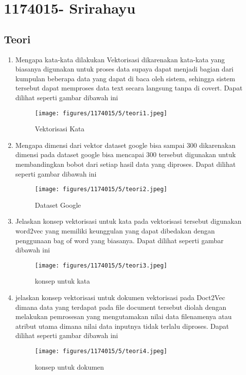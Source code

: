 \section{1174015-  Srirahayu}
    \subsection{Teori}
    \begin{enumerate}
        \item Mengapa kata-kata dilakukan Vektorisasi
        \subitem dikarenakan kata-kata yang biasanya digunakan untuk proses data supaya dapat menjadi bagian dari kumpulan beberapa data yang dapat di baca oleh sistem, sehingga sistem tersebut dapat memproses data text secara langsung tanpa di covert. Dapat dilihat seperti gambar dibawah ini
        \begin{figure}[H]
            \texttt{[image: figures/1174015/5/teori1.jpeg]}
            \centering
            \caption{Vektorisasi Kata}
        \end{figure}
        
        \item Mengapa dimensi dari vektor dataset google bisa sampai 300
        \subitem dikarenakan dimensi pada dataset google bisa mencapai 300 tersebut digunakan untuk membandingkan bobot dari setiap hasil data yang diproses. Dapat dilihat seperti gambar dibawah ini
        \begin{figure}[H]
            \texttt{[image: figures/1174015/5/teori2.jpeg]}
            \centering
            \caption{Dataset Google}
        \end{figure}
        
        \item Jelaskan konsep vektorisasi untuk kata
        \subitem pada vektorisasi tersebut digunakan word2vec yang memiliki keunggulan yang dapat dibedakan dengan penggunaan bag of word yang biasanya. Dapat dilihat seperti gambar dibawah ini
        \begin{figure}[H]
            \texttt{[image: figures/1174015/5/teori3.jpeg]}
            \centering
            \caption{konsep untuk kata}
        \end{figure}
        
        \item jelaskan konsep vektorisasi untuk dokumen
        \subitem vektorisasi pada Doct2Vec dimana data yang terdapat pada file document tersebut diolah dengan melakukan pemrosesan yang mengutamakan nilai data filenamenya atau atribut utama dimana nilai data inputnya tidak terlalu diproses. Dapat dilihat seperti gambar dibawah ini
        \begin{figure}[H]
            \texttt{[image: figures/1174015/5/teori4.jpeg]}
            \centering
            \caption{konsep untuk dokumen}
        \end{figure}
        

\end{enumerate}
